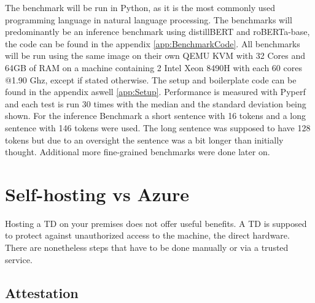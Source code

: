 The benchmark will be run in Python, as it is the most commonly used programming language in natural language processing. The benchmarks will predominantly be an inference benchmark using distillBERT and roBERTa-base, the code can be found in the appendix \ref{app:BenchmarkCode}. All benchmarks will be run using the same image on their own QEMU KVM with 32 Cores and 64GB of RAM on a machine containing 2 Intel Xeon 8490H with each 60 cores @1.90 Ghz, except if stated otherwise. The setup and boilerplate code can be found in the appendix aswell \ref{app:Setup}. Performance is measured with Pyperf and each test is run 30 times with the median and the standard deviation being shown.
For the inference Benchmark a short sentence with 16 tokens and a long sentence with 146 tokens were used. The long sentence was supposed to have 128 tokens but due to an oversight the sentence was a bit longer than initially thought. Additional more fine-grained benchmarks were done later on.


\chapter{Self-hosting vs Azure}

Hosting a TD on your premises does not offer useful benefits. A TD is supposed to protect against unauthorized access to the machine, the direct hardware. There are nonetheless steps that have to be done manually or via a trusted service. 

\section{Attestation}
\begin{table}
\centering
{}
\caption{Overview of 4 different Attestation Verification methods}
\label{tab:AttestationVerification}
\end{table}


